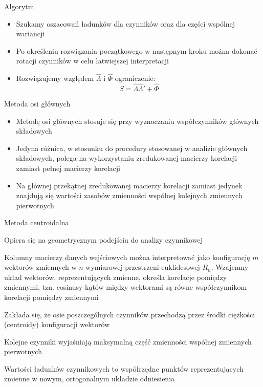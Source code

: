 \documentclass{beamer}
\begin{document}
\begin{frame}{Algorytm}
  \begin{itemize}
  \item Szukamy oszacowań ładunków dla czynników oraz dla części wspólnej wariancji
  \item Po określeniu rozwiązania początkowego w następnym kroku można dokonać rotacji czynników w celu łatwiejszej interpretacji
  \item Rozwiązujemy względem $\hat{\Lambda}$ i $\hat{\Phi}$ ograniczenie:
    $$S =  \hat{\Lambda}\hat{\Lambda}' + \hat{\Phi} $$
   \end{itemize}
\end{frame}

\begin{frame}{Metoda osi głównych}
  \begin{itemize}
   \item Metodę osi głównych stosuje się przy wyznaczaniu współczynników głównych składowych
   \item Jedyna różnica, w stosunku do procedury stosowanej w analizie głównych składowych, polega na wykorzystaniu zredukowanej macierzy korelacji zamiast pełnej macierzy korelacji
   \item Na głównej przekątnej zredukowanej macierzy korelacji zamiast jedynek znajdują się wartości zasobów zmienności wspólnej kolejnych zmiennych pierwotnych
   \end{itemize}
\end{frame}

\begin{frame}{Metoda centroidalna}
  \begin{itemize}
    \begin{scriptsize}
   \item Opiera się na geometrycznym podejściu do analizy czynnikowej
   \item Kolumny macierzy danych wejściowych można interpretować jako konfigurację $m$ wektorów zmiennych w $n$ wymiarowej przestrzeni euklidesowej $R_n$. Wzajemny układ wektorów, reprezentujących zmienne, określa korelacje pomiędzy zmiennymi, tzn. cosinusy kątów między wektorami są równe współczynnikom korelacji pomiędzy zmiennymi
   \item Zakłada się, że osie poszczególnych czynników przechodzą przez środki ciężkości (centroidy) konfiguracji wektorów
   \item Kolejne czynniki wyjaśniają maksymalną część zmienności wspólnej zmiennych pierwotnych
   \item  Wartości ładunków czynnikowych to współrzędne punktów reprezentujących zmienne w nowym, ortogonalnym układzie odniesienia
    \end{scriptsize}
   \end{itemize}
\end{frame}
\end{document}
